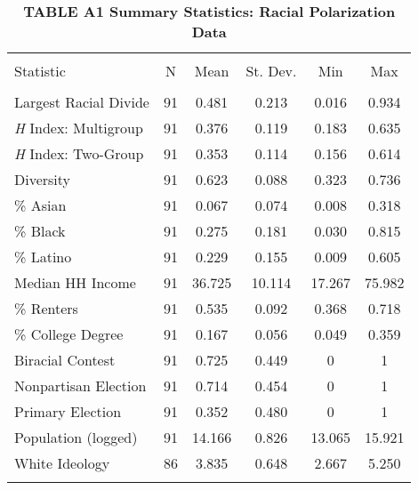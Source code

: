 \documentclass[]{article}
\begin{document}
\begin{table}[!htbp] \centering 
  \caption{\textbf{TABLE A1 Summary Statistics: Racial Polarization Data}} 
  \label{} 
\begin{tabular}{@{\extracolsep{5pt}}lccccc} 
\\[-1.8ex]\hline 
\hline \\[-1.8ex] 
Statistic & \multicolumn{1}{c}{N} & \multicolumn{1}{c}{Mean} & \multicolumn{1}{c}{St. Dev.} & \multicolumn{1}{c}{Min} & \multicolumn{1}{c}{Max} \\ 
\hline \\[-1.8ex] 
Largest Racial Divide & 91 & 0.481 & 0.213 & 0.016 & 0.934 \\ 
\emph{H} Index: Multigroup & 91 & 0.376 & 0.119 & 0.183 & 0.635 \\ 
\emph{H} Index: Two-Group & 91 & 0.353 & 0.114 & 0.156 & 0.614 \\ 
Diversity & 91 & 0.623 & 0.088 & 0.323 & 0.736 \\ 
\% Asian & 91 & 0.067 & 0.074 & 0.008 & 0.318 \\ 
\% Black & 91 & 0.275 & 0.181 & 0.030 & 0.815 \\ 
\% Latino & 91 & 0.229 & 0.155 & 0.009 & 0.605 \\ 
Median HH Income & 91 & 36.725 & 10.114 & 17.267 & 75.982 \\ 
\% Renters & 91 & 0.535 & 0.092 & 0.368 & 0.718 \\ 
\% College Degree & 91 & 0.167 & 0.056 & 0.049 & 0.359 \\ 
Biracial Contest & 91 & 0.725 & 0.449 & 0 & 1 \\ 
Nonpartisan Election & 91 & 0.714 & 0.454 & 0 & 1 \\ 
Primary Election & 91 & 0.352 & 0.480 & 0 & 1 \\ 
Population (logged) & 91 & 14.166 & 0.826 & 13.065 & 15.921 \\ 
White Ideology & 86 & 3.835 & 0.648 & 2.667 & 5.250 \\ 
\hline \\[-1.8ex] 
\end{tabular} 
\end{table}
\end{document}
